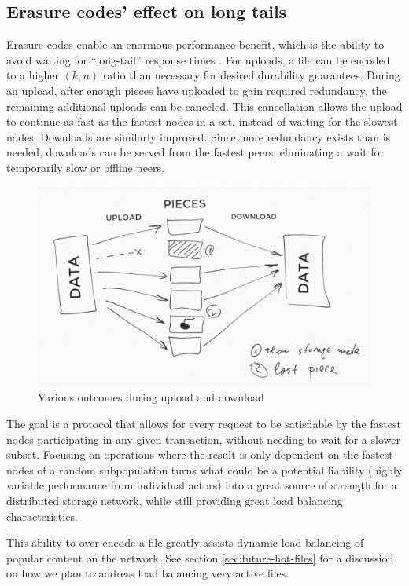 \documentclass[11pt,fleqn,openany]{book}
\begin{document}
\subsection{Erasure codes' effect on long tails}

Erasure codes enable an enormous performance benefit, which is the ability to
avoid waiting for ``long-tail'' response times \cite{tail-at-scale}. For uploads,
a file can be encoded to a higher $(k, n)$ ratio than necessary for desired
durability guarantees.
During an upload, after enough pieces have uploaded to gain required
redundancy, the remaining additional uploads can be canceled. This cancellation allows the
upload to continue as fast as the fastest nodes in a set, instead of waiting
for the slowest nodes.
Downloads are similarly improved. Since more redundancy exists
than is needed, downloads can be served from the fastest peers, eliminating a
wait for temporarily slow or offline peers.

\begin{figure}
\centering
\includegraphics[width=\textwidth]{diagram-drafts/redundancy.png}
\caption{Various outcomes during upload and download}
\end{figure}

The goal is a protocol that allows for every request to be satisfiable by the
fastest nodes participating in any given transaction, without needing to wait
for a slower subset.
Focusing on operations where the result is only dependent on the fastest
nodes of a random subpopulation turns what could be a potential liability
(highly variable performance from individual actors) into a great source of
strength for a distributed storage network, while still providing great load
balancing characteristics.

This ability to over-encode a file greatly assists dynamic load balancing of
popular content on the network. See section \ref{sec:future-hot-files} for
a discussion on how we plan to address load balancing very active files.
\end{document}
